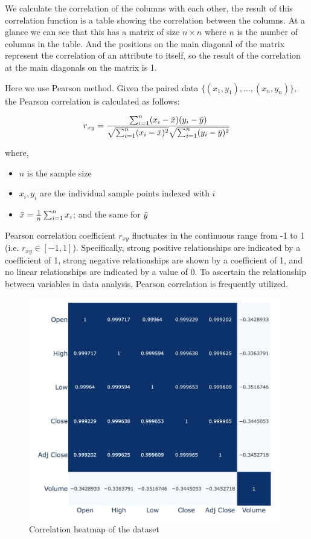 \documentclass[a4paper]{article}
\begin{document}
We calculate the correlation of the columns with each other, the result of this correlation function is a table showing the correlation between the columns. At a glance we can see that this has a matrix of size $n \times n $ where $n$ is the number of columns in the table. And the positions on the main diagonal of the matrix represent the correlation of an attribute to itself, so the result of the correlation at the main diagonals on the matrix is 1.

Here we use Pearson method. Given the paired data $\{(x_1,y_1),...,(x_{n},y_{n})\}$, the Pearson correlation is calculated as follows:

$$
r_{xy} = \frac{\sum_{i=1}^{n}(x_{i}-\Bar{x})(y_{i}-\Bar{y})}{\sqrt{\sum_{i=1}^{n}(x_{i}-\Bar{x})^2}\sqrt{\sum_{i=1}^{n}(y_{i}-\Bar{y})^2}}
$$

where,

\begin{itemize}[leftmargin=7.5pt]
    \item $n$ is the sample size
    \item $x_{i}, y_{i}$ are the individual sample points indexed with $i$
    \item $\Bar{x} = \frac{1}{n}\sum_{i=1}^{n} x_{i}$; and the same for $\Bar{y}$
\end{itemize}

Pearson correlation coefficient $r_{xy}$ fluctuates in the continuous range from -1 to 1 (i.e. $r_{xy} \in [-1,1]$). Specifically, strong positive relationships are indicated by a coefficient of 1, strong negative relationships are shown by a coefficient of 1, and no linear relationships are indicated by a value of 0. To ascertain the relationship between variables in data analysis, Pearson correlation is frequently utilized.

    
\begin{figure}[!h]
    \centering
    \includegraphics[width=11cm]{corr.png}
    \caption{Correlation heatmap of the dataset}
    \label{fig:corr}
\end{figure}
\end{document}
